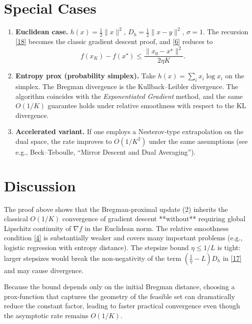 \documentclass{article}
\begin{document}
\section*{Special Cases}
\begin{enumerate}
\item \textbf{Euclidean case.}
$h(x)=\tfrac12\|x\|^{2}$, $D_h=\tfrac12\|x-y\|^{2}$, $\sigma=1$.
The recursion \eqref{18} becomes the classic gradient descent proof,
and \eqref{6} reduces to
\[
f(x_{K})-f(x^{\star})\le\frac{\|x_{0}-x^{\star}\|^{2}}{2\eta K}.
\]

\item \textbf{Entropy prox (probability simplex).}
Take $h(x)=\sum_{i}x_i\log x_i$ on the simplex.
The Bregman divergence is the Kullback–Leibler divergence.
The algorithm coincides with the \emph{Exponentiated Gradient} method,
and the same $O(1/K)$ guarantee holds under relative smoothness
with respect to the KL divergence.

\item \textbf{Accelerated variant.}
If one employs a Nesterov‑type extrapolation on the dual space,
the rate improves to $O(1/K^{2})$ under the same assumptions
(see e.g., Beck–Teboulle, “Mirror Descent and Dual Averaging”).
\end{enumerate}

\section*{Discussion}
The proof above shows that the Bregman‑proximal update (2) inherits the
classical $O(1/K)$ convergence of gradient descent **without** requiring
global Lipschitz continuity of $\nabla f$ in the Euclidean norm.  The
relative smoothness condition \eqref{4} is substantially weaker and
covers many important problems (e.g., logistic regression with
entropy distance).  The stepsize bound $\eta\le1/L$ is tight: larger
stepsizes would break the non‑negativity of the term
$(\frac{1}{\eta}-L)D_h$ in \eqref{17} and may cause divergence.

Because the bound depends only on the initial Bregman distance,
choosing a prox‑function that captures the geometry of the feasible
set can dramatically reduce the constant factor, leading to faster
practical convergence even though the asymptotic rate remains $O(1/K)$.
\end{document}
